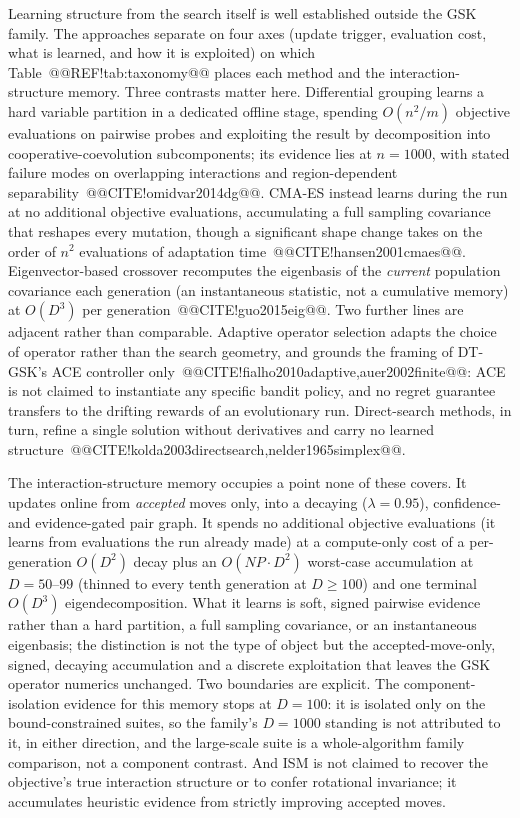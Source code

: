 \documentclass[10pt,a4paper]{article}
\newcommand{\dtgsk}{DT-GSK}
\begin{document}
Learning structure from the search itself is well established outside
the GSK family. The approaches separate on four axes (update trigger,
evaluation cost, what is learned, and how it is exploited) on which
Table~@@REF!tab:taxonomy@@ places each method and the interaction-structure
memory. Three contrasts matter here. Differential grouping learns a hard
variable partition in a dedicated offline stage, spending $O(n^2/m)$ objective
evaluations on pairwise probes and exploiting the result by decomposition into
cooperative-coevolution subcomponents; its evidence lies at $n = 1000$, with
stated failure modes on overlapping interactions and region-dependent
separability~@@CITE!omidvar2014dg@@. 
CMA-ES instead learns during the run at no additional objective evaluations,
accumulating a full sampling covariance that reshapes every mutation, though a
significant shape change takes on the order of $n^2$ evaluations of adaptation
time~@@CITE!hansen2001cmaes@@. 
Eigenvector-based crossover recomputes the eigenbasis of the \emph{current}
population covariance each generation (an instantaneous statistic, not a
cumulative memory) at $O(D^3)$ per generation~@@CITE!guo2015eig@@. 
Two further lines are adjacent rather than comparable. Adaptive operator
selection adapts the choice of operator rather than the search geometry, and
grounds the framing of \dtgsk{}'s ACE controller
only~@@CITE!fialho2010adaptive,auer2002finite@@: ACE is not claimed to
instantiate any specific bandit policy, and no regret guarantee transfers to
the drifting rewards of an evolutionary run. Direct-search methods, in turn,
refine a single solution without derivatives and carry no learned
structure~@@CITE!kolda2003directsearch,nelder1965simplex@@.

The interaction-structure memory occupies a point none of these covers. It
updates online from \emph{accepted} moves only, into a decaying
($\lambda = 0.95$), confidence- and evidence-gated pair
graph. 
It spends no additional objective evaluations (it learns from evaluations the
run already made) at a compute-only cost of a per-generation $O(D^2)$ decay
plus an $O(\mathit{NP} \cdot D^{2})$ worst-case accumulation at $D = 50$--$99$
(thinned to every tenth generation at $D \ge 100$) and one terminal $O(D^3)$
eigendecomposition. 
What it learns is soft, signed pairwise evidence rather than a hard partition, a
full sampling covariance, or an instantaneous eigenbasis; the distinction is not
the type of object but the accepted-move-only, signed, decaying accumulation and
a discrete exploitation that leaves the GSK operator numerics unchanged. Two
boundaries are explicit. The component-isolation evidence for this memory stops
at $D = 100$: it is isolated only on the bound-constrained suites, so the
family's $D = 1000$ standing is not attributed to it, in either direction,
and the large-scale suite is a whole-algorithm family comparison, not a
component contrast. 
And ISM is not claimed to recover the objective's true interaction structure
or to confer rotational invariance; it accumulates heuristic evidence from
strictly improving accepted moves.
\end{document}
